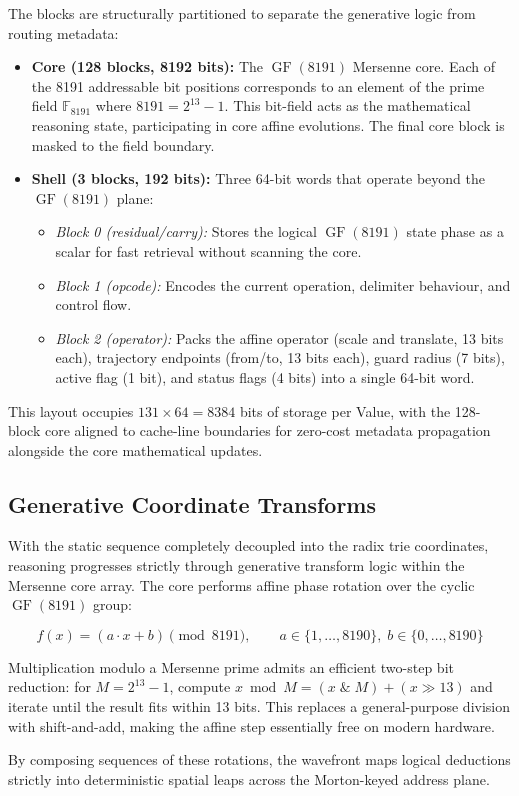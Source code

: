 The blocks are structurally partitioned to separate the generative logic from routing metadata:
\begin{itemize}[nosep]
  \item \textbf{Core (128 blocks, 8192 bits):} The $\operatorname{GF}(8191)$ Mersenne core. Each of the 8191 addressable bit positions corresponds to an element of the prime field $\mathbb{F}_{8191}$ where $8191 = 2^{13} - 1$. This bit-field acts as the mathematical reasoning state, participating in core affine evolutions. The final core block is masked to the field boundary.
  \item \textbf{Shell (3 blocks, 192 bits):} Three 64-bit words that operate beyond the $\operatorname{GF}(8191)$ plane:
  \begin{itemize}[nosep]
    \item \emph{Block 0 (residual/carry):} Stores the logical $\operatorname{GF}(8191)$ state phase as a scalar for fast retrieval without scanning the core.
    \item \emph{Block 1 (opcode):} Encodes the current operation, delimiter behaviour, and control flow.
    \item \emph{Block 2 (operator):} Packs the affine operator (scale and translate, 13 bits each), trajectory endpoints (from/to, 13 bits each), guard radius (7 bits), active flag (1 bit), and status flags (4 bits) into a single 64-bit word.
  \end{itemize}
\end{itemize}

This layout occupies $131 \times 64 = 8384$ bits of storage per Value, with the 128-block core aligned to cache-line boundaries for zero-cost metadata propagation alongside the core mathematical updates.

\subsection{Generative Coordinate Transforms}
\label{sec:affine_transform}

With the static sequence completely decoupled into the radix trie coordinates, reasoning progresses strictly through generative transform logic within the Mersenne core array. The core performs affine phase rotation over the cyclic $\operatorname{GF}(8191)$ group:

\begin{equation}
  f(x) = (a \cdot x + b) \pmod{8191}, \qquad
  a \in \{1, \ldots, 8190\},\; b \in \{0, \ldots, 8190\}
  \label{eq:gf_affine}
\end{equation}

Multiplication modulo a Mersenne prime admits an efficient two-step bit reduction: for $M = 2^{13} - 1$, compute $x \bmod M = (x \;\&\; M) + (x \gg 13)$ and iterate until the result fits within 13 bits. This replaces a general-purpose division with shift-and-add, making the affine step essentially free on modern hardware.

By composing sequences of these rotations, the wavefront maps logical deductions strictly into deterministic spatial leaps across the Morton-keyed address plane.

